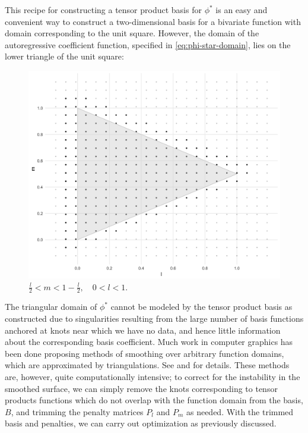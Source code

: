 \documentclass[12pt]{article}
\theoremstyle{definition}
\begin{document}
This recipe for constructing a tensor product basis for $\phi^*$ is an easy and convenient way to construct a two-dimensional basis for a bivariate function with domain corresponding to the unit square. However, the domain of the autoregressive coefficient function, specified in \ref{eq:phi-star-domain}, lies on the lower triangle of the unit square:

\begin{figure}[H] \label{fig:triangle-domain}
    \graphicspath{{img/}}
 \includegraphics[scale=0.2]{knot-removal-on-triangle-domain.png}
 \caption{$\frac{l}{2} < m < 1 - \frac{l}{2}, \quad 0 < l < 1.$}
 \end{figure}

The triangular domain of $\phi^*$ cannot be modeled by the tensor product basis as constructed due to singularities resulting from the large number of basis functions anchored at knots near which we have no data, and hence little information about the corresponding basis coefficient. Much work in computer graphics has been done proposing methods of smoothing over arbitrary function domains, which are approximated by triangulations. See \citet{dahmen1992blossoming} and \citet{seidel1991symmetric} for details. These methods are, however, quite computationally intensive; to correct for the instability in the smoothed surface, we can simply remove the knots corresponding to tensor products functions which do not overlap with the function domain from the basis, $B$, and trimming the penalty matrices $P_l$ and $P_m$ as needed. With the trimmed basis and penalties, we can carry out optimization as previously discussed.
\end{document}
